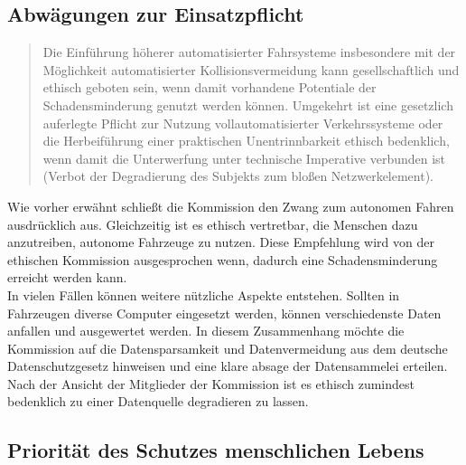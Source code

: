 \documentclass[twoside,a4paper,12pt]{article}
\begin{document}
\subsection{Abwägungen zur Einsatzpflicht} \label{AbwaegungenZurEinsatzpflicht}

\begin{quote}
\glqq
Die Einführung höherer automatisierter Fahrsysteme insbesondere mit der Möglichkeit
automatisierter Kollisionsvermeidung kann gesellschaftlich und ethisch geboten sein,
wenn damit vorhandene Potentiale der Schadensminderung genutzt werden können.
Umgekehrt ist eine gesetzlich auferlegte Pflicht zur Nutzung vollautomatisierter Verkehrssysteme oder die Herbeiführung 
einer praktischen Unentrinnbarkeit ethisch bedenklich, wenn damit die Unterwerfung unter technische Imperative verbunden 
ist (Verbot der Degradierung des Subjekts zum bloßen Netzwerkelement).\grqq\mbox{~\cite[S. 11]{ek}}
\end{quote}
Wie vorher erwähnt schließt die Kommission den Zwang zum autonomen Fahren ausdrücklich aus. Gleichzeitig ist es ethisch vertretbar, die Menschen dazu anzutreiben, autonome Fahrzeuge zu nutzen. Diese Empfehlung wird von der ethischen Kommission ausgesprochen wenn, dadurch eine Schadensminderung erreicht werden kann. \\
In vielen Fällen können weitere nützliche Aspekte entstehen. Sollten in Fahrzeugen diverse Computer eingesetzt werden, können verschiedenste Daten anfallen und ausgewertet werden. In diesem Zusammenhang möchte die Kommission auf die Datensparsamkeit und Datenvermeidung aus dem deutsche Datenschutzgesetz hinweisen und eine klare absage der Datensammelei erteilen. Nach der Ansicht der Mitglieder der Kommission ist es ethisch zumindest bedenklich zu einer Datenquelle degradieren zu lassen.

\subsection{Priorität des Schutzes menschlichen Lebens} \label{PrioritäDesSchutzesMenschlichenLebens}
\end{document}
